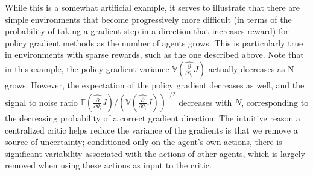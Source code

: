 \documentclass{article}
\newcommand{\comment}[1]{\textbf{\textcolor{red}{comment: #1}}}
\newcommand{\dd}{\frac{\partial}{\partial \theta_i}}
\begin{document}
While this is a somewhat artificial example, it serves to illustrate that there are simple environments that become progressively more difficult  (in terms of the probability of taking a gradient step in a direction that increases reward) for policy gradient methods as the number of agents grows. This is particularly true in environments with sparse rewards, such as the one described above. Note that in this example, the policy gradient variance $\mathbb V (\hat{\dd} J )$ actually decreases as N grows. However, the expectation of the policy gradient decreases as well, and the signal to noise ratio $\mathbb E (\hat{\dd} J ) / (\mathbb V (\hat{\dd} J ))^{1/2}$ decreases with $N$, corresponding to the decreasing probability of a correct gradient direction. %
The intuitive reason a centralized critic helps reduce the variance of the gradients is that we remove a source of uncertainty; conditioned only on the agent's own actions, there is significant variability associated with the actions of other agents, which is largely removed when using these actions as input to the critic.










\end{document}
